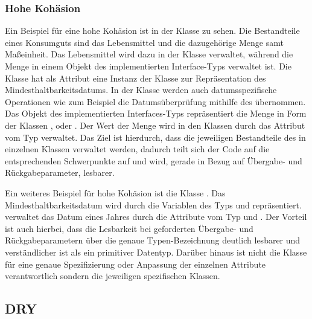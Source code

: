 \subsubsection*{Hohe Kohäsion}

Ein Beispiel für eine hohe Kohäsion ist in der Klasse  zu sehen.
Die Bestandteile eines Konsumguts sind das Lebensmittel und die dazugehörige Menge samt Maßeinheit.
Das Lebensmittel wird dazu in der Klasse  verwaltet, während die Menge in einem Objekt des implementierten Interface-Typs  verwaltet ist.
Die Klasse  hat als Attribut eine Instanz der Klasse  zur Repräsentation des Mindesthaltbarkeitsdatums.
In der Klasse  werden auch datumsspezifische Operationen wie zum Beispiel die Datumsüberprüfung mithilfe des  übernommen.
Das Objekt des implementierten Interfaces-Typs  repräsentiert die Menge in Form der Klassen ,  oder .
Der Wert der Menge wird in den Klassen durch das Attribut vom Typ  verwaltet.
Das Ziel ist hierdurch, dass die jeweiligen Bestandteile des  in einzelnen Klassen verwaltet werden, dadurch teilt sich der Code auf die entsprechenden Schwerpunkte auf und wird, gerade in Bezug auf Übergabe- und Rückgabeparameter, lesbarer.


Ein weiteres Beispiel für hohe Kohäsion ist die Klasse .
Das Mindesthaltbarkeitsdatum wird durch die Variablen des Typs  und  repräsentiert.
 verwaltet das Datum eines Jahres durch die Attribute vom Typ  und .
Der Vorteil ist auch hierbei, dass die Lesbarkeit bei geforderten Übergabe- und Rückgabeparametern über die genaue Typen-Bezeichnung deutlich lesbarer und verständlicher ist als ein primitiver Datentyp.
Darüber hinaus ist nicht die Klasse  für eine genaue Spezifizierung oder Anpassung der einzelnen Attribute verantwortlich sondern die jeweiligen spezifischen Klassen.


\subsection{\ac{DRY}}

